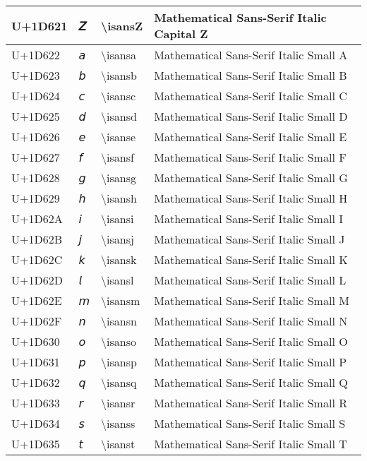 \begin{table}[h]
\begin{tabulary}{\linewidth}{|L|L|L|L|}
\hline
U+1D621 & 𝘡 & {\textbackslash}isansZ & Mathematical Sans-Serif Italic Capital Z \\
\hline
U+1D622 & 𝘢 & {\textbackslash}isansa & Mathematical Sans-Serif Italic Small A \\
\hline
U+1D623 & 𝘣 & {\textbackslash}isansb & Mathematical Sans-Serif Italic Small B \\
\hline
U+1D624 & 𝘤 & {\textbackslash}isansc & Mathematical Sans-Serif Italic Small C \\
\hline
U+1D625 & 𝘥 & {\textbackslash}isansd & Mathematical Sans-Serif Italic Small D \\
\hline
U+1D626 & 𝘦 & {\textbackslash}isanse & Mathematical Sans-Serif Italic Small E \\
\hline
U+1D627 & 𝘧 & {\textbackslash}isansf & Mathematical Sans-Serif Italic Small F \\
\hline
U+1D628 & 𝘨 & {\textbackslash}isansg & Mathematical Sans-Serif Italic Small G \\
\hline
U+1D629 & 𝘩 & {\textbackslash}isansh & Mathematical Sans-Serif Italic Small H \\
\hline
U+1D62A & 𝘪 & {\textbackslash}isansi & Mathematical Sans-Serif Italic Small I \\
\hline
U+1D62B & 𝘫 & {\textbackslash}isansj & Mathematical Sans-Serif Italic Small J \\
\hline
U+1D62C & 𝘬 & {\textbackslash}isansk & Mathematical Sans-Serif Italic Small K \\
\hline
U+1D62D & 𝘭 & {\textbackslash}isansl & Mathematical Sans-Serif Italic Small L \\
\hline
U+1D62E & 𝘮 & {\textbackslash}isansm & Mathematical Sans-Serif Italic Small M \\
\hline
U+1D62F & 𝘯 & {\textbackslash}isansn & Mathematical Sans-Serif Italic Small N \\
\hline
U+1D630 & 𝘰 & {\textbackslash}isanso & Mathematical Sans-Serif Italic Small O \\
\hline
U+1D631 & 𝘱 & {\textbackslash}isansp & Mathematical Sans-Serif Italic Small P \\
\hline
U+1D632 & 𝘲 & {\textbackslash}isansq & Mathematical Sans-Serif Italic Small Q \\
\hline
U+1D633 & 𝘳 & {\textbackslash}isansr & Mathematical Sans-Serif Italic Small R \\
\hline
U+1D634 & 𝘴 & {\textbackslash}isanss & Mathematical Sans-Serif Italic Small S \\
\hline
U+1D635 & 𝘵 & {\textbackslash}isanst & Mathematical Sans-Serif Italic Small T \\

\end{tabulary}
\end{table}
